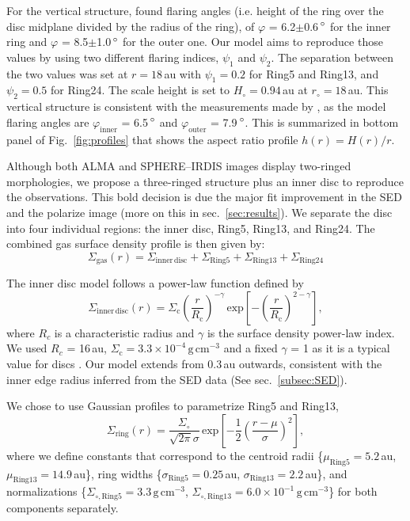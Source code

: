 \documentclass[fleqn,usenatbib,useAMS]{mnras}
\begin{document}
For the vertical structure, \citet{dOrazi} found flaring angles (i.e. height of the ring over the disc midplane divided by the radius of the ring), of $\varphi$ = 6.2$\pm$0.6\,$\hbox{$^\circ$}$ for the inner ring and $\varphi$ = 8.5$\pm$1.0\,$\hbox{$^\circ$}$ for the outer one. Our model aims to reproduce those values by using two different flaring indices, $\psi_1$ and $\psi_2$. The separation between the two values was set at $r = 18$\,au with $\psi_1=0.2$ for Ring5 and Ring13, and $\psi_2=0.5$ for Ring24. The scale height is set to $H_\circ = 0.94$\,au at $r_\circ = 18$\,au. This vertical structure is consistent with the measurements made by \citet{dOrazi}, as the model flaring angles are $\varphi_{\mathrm{inner}}$ = 6.5\,$\hbox{$^\circ$}$ and $\varphi_{\mathrm{outer}}$ = 7.9\,$\hbox{$^\circ$}$. This is summarized in bottom panel of Fig.~\ref{fig:profiles} that shows the aspect ratio profile $h(r)=H(r)/r$.

Although both ALMA and SPHERE--IRDIS images display two-ringed morphologies, we propose a three-ringed structure plus an inner disc to reproduce the observations. This bold decision is due the major fit improvement in the SED and the polarize image (more on this in sec.~\ref{sec:results}). We separate the disc into four individual regions: the inner disc, Ring5, Ring13, and Ring24. The combined gas surface density profile is then given by:
\begin{equation}
  \Sigma_{\mathrm{gas}}(r) = \Sigma_{\mathrm{inner\,disc}} + \Sigma_{\mathrm{Ring5}} + \Sigma_{\mathrm{Ring13}} + \Sigma_{\mathrm{Ring24}}
\end{equation}

The inner disc model follows a power-law function defined by
\begin{equation}
  \Sigma_{\mathrm{inner\,disc}}(r) =\Sigma_\mathrm{c} \left(\frac{r}{R_\mathrm{c}}\right)^{-\gamma}  \, \mathrm{exp}\left[-\left(\frac{r}{R_\mathrm{c}}\right)^{2-\gamma}\right],
\end{equation}
where $R_c$ is a characteristic radius and $\gamma$ is the surface density power-law index. We used $R_c$ = 16\,au, $\Sigma_\mathrm{c} =3.3\times10^{-4}$\,$\mathrm{g\,cm^{-3}}$ and a fixed $\gamma$ = 1 as it is a typical value for discs \citep{Andrews_2009,Andrews_2010}. Our model extends from 0.3\,au outwards, consistent with the inner edge radius inferred from the SED data (See sec.~\ref{subsec:SED}).

We chose to use Gaussian profiles to parametrize Ring5 and Ring13,
\begin{equation}
  \Sigma_{\mathrm{ring}}(r) = \frac{\Sigma_\circ}{\sqrt{2 \pi} \sigma}
  \, \mathrm{exp}\left[-\frac{1}{2}\left(\frac{r-\mu}{\sigma}\right)^{2}\right],
\end{equation}
where we define constants that correspond to the centroid radii \{$\mu_{\mathrm{Ring5}}=5.2$\,au, $\mu_{\mathrm{Ring13}}=14.9$\,au\}, ring widths \{$\sigma_{\mathrm{Ring5}}=0.25$\,au, $\sigma_{\mathrm{Ring13}}=2.2$\,au\}, and normalizations \{$\Sigma_{\circ,\mathrm{Ring5}}=3.3$\,$\mathrm{g\,cm^{-3}}$, $\Sigma_{\circ,\mathrm{Ring13}}=6.0 \times 10^{-1}$\,$\mathrm{g\,cm^{-3}}$\} for both components separately.
\end{document}
